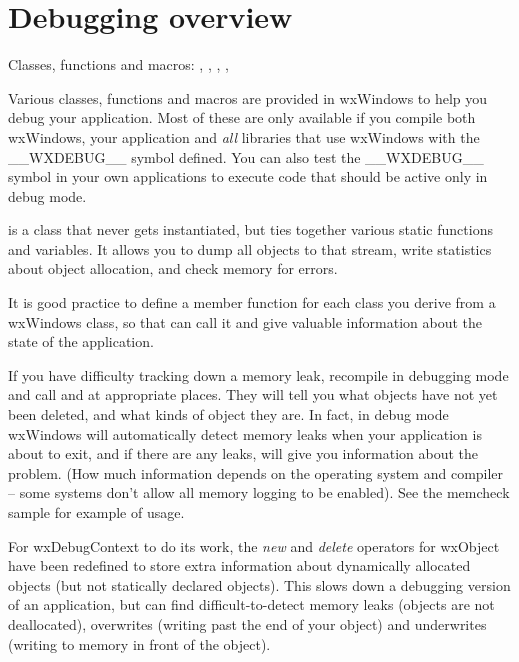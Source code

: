 \section{Debugging overview}\label{debuggingoverview}

Classes, functions and macros: , , ,
\rtfsp{}, 

Various classes, functions and macros are provided in wxWindows to help you debug
your application. Most of these are only available if you compile both wxWindows,
your application and {\it all} libraries that use wxWindows with the \_\_WXDEBUG\_\_ symbol
defined. You can also test the \_\_WXDEBUG\_\_ symbol in your own applications to execute
code that should be active only in debug mode.


 is a class that never gets instantiated, but ties together
various static functions and variables. It allows you to dump all objects to that stream, write statistics about object allocation, and
check memory for errors.

It is good practice to define a  member function for each class you derive
from a wxWindows class, so that  can call it and
give valuable information about the state of the application.

If you have difficulty tracking down a memory leak, recompile
in debugging mode and call  and  at
appropriate places. They will tell you what objects have not yet been
deleted, and what kinds of object they are. In fact, in debug mode wxWindows will automatically
detect memory leaks when your application is about to exit, and if there are any leaks,
will give you information about the problem. (How much information depends on the operating system
and compiler -- some systems don't allow all memory logging to be enabled). See the
memcheck sample for example of usage.

For wxDebugContext to do its work, the {\it new} and {\it delete}\rtfsp
operators for wxObject have been redefined to store extra information
about dynamically allocated objects (but not statically declared
objects). This slows down a debugging version of an application, but can
find difficult-to-detect memory leaks (objects are not
deallocated), overwrites (writing past the end of your object) and
underwrites (writing to memory in front of the object).

